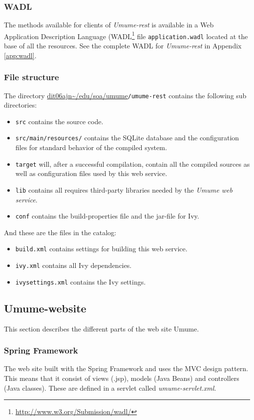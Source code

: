 \documentclass[titlepage, twocolumn, a4paper, 10pt]{article}
\def\pathtocode{\url{dit06ajn~/edu/soa/umume}}
\begin{document}
\subsubsection{WADL}
The methods available for clients of \textit{Umume-rest} is available
in a Web Application Description Language
(WADL\footnote{\url{http://www.w3.org/Submission/wadl/}} file
\texttt{application.wadl} located at the base of all the resources.
See the complete WADL for \textit{Umume-rest} in Appendix
\ref{app:wadl}.

\subsubsection{File structure}\label{sec:filestructurerest}
The directory \pathtocode\texttt{/umume-rest} contains the
following sub directories:
\begin{itemize}
\item \verb!src! contains the source code.
\item \verb!src/main/resources/! contains the SQLite database and
  the configuration
  files for standard behavior of the compiled system.
\item \verb!target! will, after a successful compilation,
  contain all the compiled sources as well as configuration files used
  by this web service.
\item \verb!lib! contains all requires third-party libraries
  needed by the \textit{Umume web service}.
\item \verb!conf! contains the build-properties file and the jar-file for Ivy.
\end{itemize}

And these are the files in the catalog:
\begin{itemize}
\item \verb!build.xml! contains settings for building this web service.
\item \verb!ivy.xml! contains all Ivy dependencies.
\item \verb!ivysettings.xml! contains the Ivy settings.
\end{itemize}

\subsection{Umume-website}\label{sec:umume-website}

This section describes the different parts of the web site Umume.

\subsubsection{Spring Framework}\label{springframework}
The web site built with the Spring Framework and uses the MVC
design pattern. This means that it consist of views (.jsp), models (Java Beans)
and controllers (Java classes). These are defined in a servlet called
\textit{umume-servlet.xml}.
\end{document}
